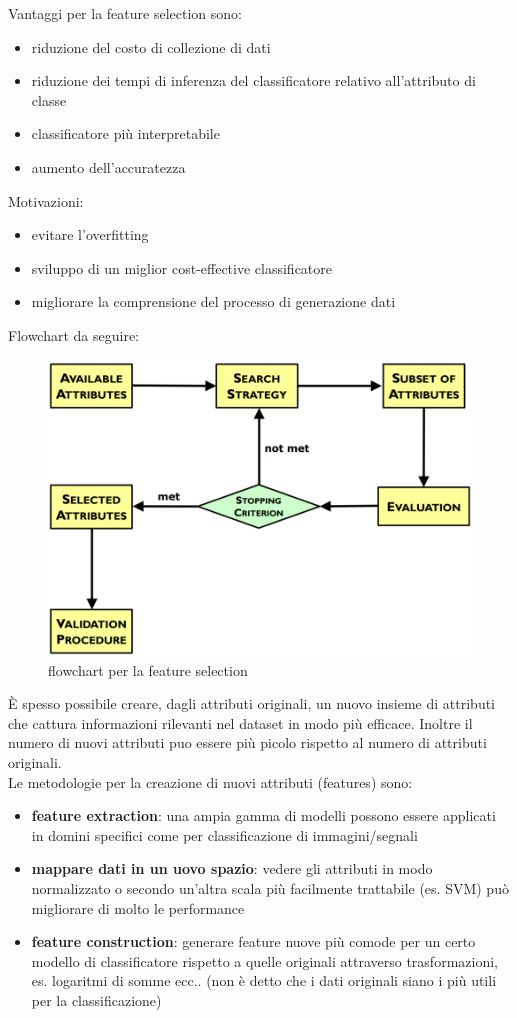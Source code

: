 \noindent
Vantaggi per la feature selection sono:
\begin{itemize}
	\item riduzione del costo di collezione di dati
	\item riduzione dei tempi di inferenza del classificatore relativo all'attributo di classe
	\item classificatore pi\`u interpretabile
	\item aumento dell'accuratezza
\end{itemize}
Motivazioni:
\begin{itemize}
	\item evitare l'overfitting
	\item sviluppo di un miglior cost-effective classificatore
	\item migliorare la comprensione del processo di generazione dati
\end{itemize}

Flowchart da seguire:
\begin{figure}[H]
	\centering
	\includegraphics[height=0.45 \linewidth]{classification/pict/feature_flowchart.png}
	\caption{flowchart per la feature selection}
\end{figure}

È spesso possibile creare, dagli attributi originali, un nuovo insieme di attributi che cattura informazioni rilevanti nel dataset in modo più efficace. Inoltre il numero di nuovi attributi puo essere più picolo rispetto al numero di attributi originali.\\

Le metodologie per la creazione di nuovi attributi (features) sono:
\begin{itemize}
	\item \textbf{feature extraction}: una ampia gamma di modelli possono essere applicati in domini specifici come per classificazione di immagini/segnali
	\item \textbf{mappare dati in un uovo spazio}: vedere gli attributi in modo normalizzato o secondo un'altra scala pi\`u facilmente trattabile (es. SVM) può migliorare di molto le performance
	\item \textbf{feature construction}: generare feature nuove pi\`u comode per un certo modello di classificatore rispetto a quelle originali attraverso trasformazioni, es. logaritmi di somme ecc.. (non \`e detto che i dati originali siano i pi\`u utili per la classificazione)
\end{itemize}
